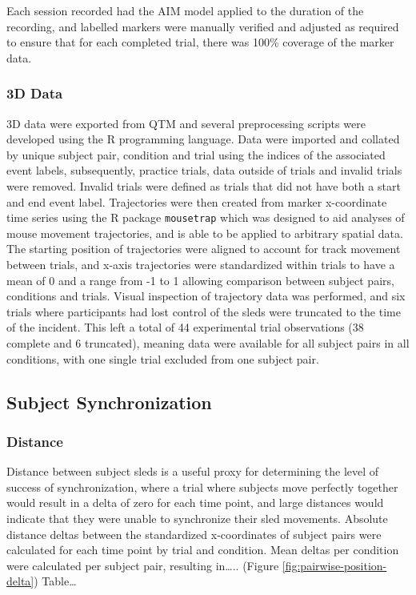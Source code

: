 \documentclass[10pt,a4paper,onecolumn]{article}
\begin{document}
Each session recorded had the AIM model applied to the duration of the recording, and labelled markers were manually verified and adjusted as required to ensure that for each completed trial, there was 100\% coverage of the marker data.

\hypertarget{d-data}{%
\subsubsection{3D Data}\label{d-data}}

3D data were exported from QTM and several preprocessing scripts were developed using the R programming language. Data were imported and collated by unique subject pair, condition and trial using the indices of the associated event labels, subsequently, practice trials, data outside of trials and invalid trials were removed. Invalid trials were defined as trials that did not have both a start and end event label. Trajectories were then created from marker x-coordinate time series using the R package \texttt{mousetrap} \autocite{mousetrap2021} which was designed to aid analyses of mouse movement trajectories, and is able to be applied to arbitrary spatial data. The starting position of trajectories were aligned to account for track movement between trials, and x-axis trajectories were standardized within trials to have a mean of 0 and a range from -1 to 1 allowing comparison between subject pairs, conditions and trials. Visual inspection of trajectory data was performed, and six trials where participants had lost control of the sleds were truncated to the time of the incident. This left a total of 44 experimental trial observations (38 complete and 6 truncated), meaning data were available for all subject pairs in all conditions, with one single trial excluded from one subject pair.

\hypertarget{subject-synchronization}{%
\subsection{Subject Synchronization}\label{subject-synchronization}}

\hypertarget{distance}{%
\subsubsection{Distance}\label{distance}}

Distance between subject sleds is a useful proxy for determining the level of success of synchronization, where a trial where subjects move perfectly together would result in a delta of zero for each time point, and large distances would indicate that they were unable to synchronize their sled movements. Absolute distance deltas between the standardized x-coordinates of subject pairs were calculated for each time point by trial and condition. Mean deltas per condition were calculated per subject pair, resulting in\ldots.. (Figure \ref{fig:pairwise-position-delta})
Table\ldots{}
\end{document}
